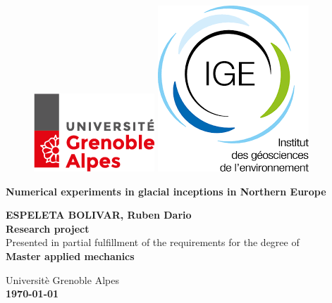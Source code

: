 \thispagestyle{empty}
\begin{center}
    	\begin{figure} [t]
		\includegraphics[width=0.2\linewidth]{fig/logo_UGA.png}
		\hspace{8.0cm}
		\includegraphics[width=0.2\linewidth]{fig/logo_IGE.png}
		\vspace{2.0cm}
	    \end{figure}

        \begin{Large}
        \textbf{Numerical experiments in glacial inceptions in Northern Europe} 
        \end{Large}
        
        \vspace{0.8cm}
        \textbf{ESPELETA BOLIVAR, Ruben Dario}\\
        \vspace{3.0cm}
        \textbf{Research project}\\
	    Presented in partial fulfillment of the requirements for the degree of\\
	    \textbf{Master applied mechanics}\\
        \vspace{3.0cm}

        Universitè Grenoble Alpes\\
        \textbf{\today}
        \vspace{4.0cm}
\end{center}
\clearpage